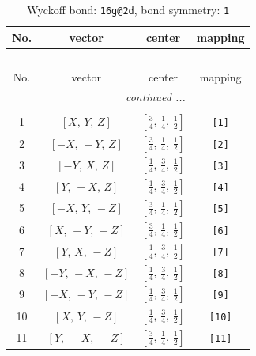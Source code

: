 \documentclass[fleqn,8pt]{jsarticle}
\begin{document}
\begin{longtable}{cccc}
\caption{Wyckoff bond: {\tt 16g@2d}, bond symmetry: {\tt 1}}
 \\
 \hline \hline
No. & vector & center & mapping \\ \hline \endfirsthead

\multicolumn{3}{l}{\tablename\ \thetable{}} \\
 \hline \hline
No. & vector & center & mapping \\ \hline \endhead

 \hline \hline
\multicolumn{3}{r}{\footnotesize\it continued ...} \\ \endfoot

 \hline \hline
\multicolumn{3}{r}{} \\ \endlastfoot

1 & $\left[ X,\, Y,\, Z \right]$ & $\left[ \frac{3}{4},\, \frac{1}{4},\, \frac{1}{2} \right]$ & {\tt [1]} \\ \hline
2 & $\left[ - X,\, - Y,\, Z \right]$ & $\left[ \frac{3}{4},\, \frac{1}{4},\, \frac{1}{2} \right]$ & {\tt [2]} \\ \hline
3 & $\left[ - Y,\, X,\, Z \right]$ & $\left[ \frac{1}{4},\, \frac{3}{4},\, \frac{1}{2} \right]$ & {\tt [3]} \\ \hline
4 & $\left[ Y,\, - X,\, Z \right]$ & $\left[ \frac{1}{4},\, \frac{3}{4},\, \frac{1}{2} \right]$ & {\tt [4]} \\ \hline
5 & $\left[ - X,\, Y,\, - Z \right]$ & $\left[ \frac{3}{4},\, \frac{1}{4},\, \frac{1}{2} \right]$ & {\tt [5]} \\ \hline
6 & $\left[ X,\, - Y,\, - Z \right]$ & $\left[ \frac{3}{4},\, \frac{1}{4},\, \frac{1}{2} \right]$ & {\tt [6]} \\ \hline
7 & $\left[ Y,\, X,\, - Z \right]$ & $\left[ \frac{1}{4},\, \frac{3}{4},\, \frac{1}{2} \right]$ & {\tt [7]} \\ \hline
8 & $\left[ - Y,\, - X,\, - Z \right]$ & $\left[ \frac{1}{4},\, \frac{3}{4},\, \frac{1}{2} \right]$ & {\tt [8]} \\ \hline
9 & $\left[ - X,\, - Y,\, - Z \right]$ & $\left[ \frac{1}{4},\, \frac{3}{4},\, \frac{1}{2} \right]$ & {\tt [9]} \\ \hline
10 & $\left[ X,\, Y,\, - Z \right]$ & $\left[ \frac{1}{4},\, \frac{3}{4},\, \frac{1}{2} \right]$ & {\tt [10]} \\ \hline
11 & $\left[ Y,\, - X,\, - Z \right]$ & $\left[ \frac{3}{4},\, \frac{1}{4},\, \frac{1}{2} \right]$ & {\tt [11]} \\ \hline

\end{longtable}
\end{document}
